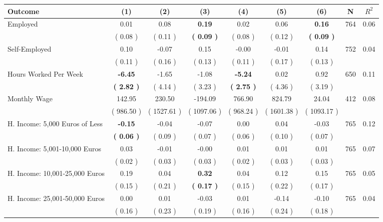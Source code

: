 \begin{tabular}{lcccccccc}
\toprule
 \textbf{Outcome} & \textbf{(1)} & \textbf{(2)} & \textbf{(3)} & \textbf{(4)} & \textbf{(5)} & \textbf{(6)} & \textbf{N} & \textbf{$ R^2$} \\
\midrule
Employed &      0.01 &      0.08 & \textbf{     0.19} &      0.02 &      0.06 & \textbf{     0.16} & 764 &       0.06 \\ 
 & (     0.08 ) & (     0.11 ) & \textbf{(     0.09 )} & (     0.08 ) & (     0.12 ) & \textbf{(     0.09 )} & \\
Self-Employed &      0.10 &     -0.07 &      0.15 &     -0.00 &     -0.01 &      0.14 & 752 &       0.04 \\ 
 & (     0.11 ) & (     0.16 ) & (     0.13 ) & (     0.11 ) & (     0.17 ) & (     0.13 ) & \\
Hours Worked Per Week & \textbf{    -6.45} &     -1.65 &     -1.08 & \textbf{    -5.24} &      0.02 &      0.92 & 650 &       0.11 \\ 
 & \textbf{(     2.82 )} & (     4.14 ) & (     3.23 ) & \textbf{(     2.75 )} & (     4.36 ) & (     3.19 ) & \\
Monthly Wage &    142.95 &    230.50 &   -194.09 &    766.90 &    824.79 &     24.04 & 412 &       0.08 \\ 
 & (   986.50 ) & (  1527.61 ) & (  1097.06 ) & (   968.24 ) & (  1601.38 ) & (  1093.17 ) & \\
H. Income: 5,000 Euros of Less & \textbf{    -0.15} &     -0.04 &     -0.07 &      0.00 &      0.04 &     -0.03 & 765 &       0.12 \\ 
 & \textbf{(     0.06 )} & (     0.09 ) & (     0.07 ) & (     0.06 ) & (     0.10 ) & (     0.07 ) & \\
H. Income: 5,001-10,000 Euros &      0.03 &     -0.01 &     -0.00 &      0.01 &      0.01 &      0.01 & 765 &       0.07 \\ 
 & (     0.02 ) & (     0.03 ) & (     0.03 ) & (     0.02 ) & (     0.03 ) & (     0.03 ) & \\
H. Income: 10,001-25,000 Euros &      0.19 &      0.04 & \textbf{     0.32} &      0.04 &      0.12 &      0.15 & 765 &       0.05 \\ 
 & (     0.15 ) & (     0.21 ) & \textbf{(     0.17 )} & (     0.15 ) & (     0.22 ) & (     0.17 ) & \\
H. Income: 25,001-50,000 Euros &      0.00 &      0.01 &     -0.03 &      0.01 &     -0.14 &     -0.10 & 765 &       0.04 \\ 
 & (     0.16 ) & (     0.23 ) & (     0.19 ) & (     0.16 ) & (     0.24 ) & (     0.18 ) & \\

\end{tabular}
